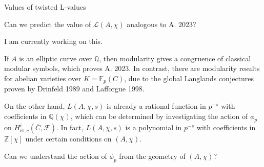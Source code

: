 \documentclass[10pt]{beamer}
\begin{document}
\begin{frame}[t]{Values of twisted L-values}

Can we predict the value of $ \mathcal{L}(A, \chi) $ analogous to A. 2023?

\pause

\vspace{0.5cm} I am currently working on this.

\pause

\vspace{0.5cm} If $ A $ is an elliptic curve over $ \mathbb{Q} $, then modularity gives a congruence of classical modular symbols, which proves A. 2023. \pause In contrast, there are modularity results for abelian varieties over $ K = \mathbb{F}_p(C) $, due to the global Langlands conjectures proven by Drinfeld 1989 and Lafforgue 1998.

\pause

\vspace{0.5cm} On the other hand, $ L(A, \chi, s) $ is already a rational function in $ p^{-s} $ with coefficients in $ \mathbb{Q}(\chi) $, which can be determined by investigating the action of $ \phi_p $ on $ H_{\text{\'et}, c}^i(\overline{C}, \mathcal{F}) $. \pause In fact, $ L(A, \chi, s) $ is a polynomial in $ p^{-s} $ with coefficients in $ \mathbb{Z}[\chi] $ under certain conditions on $ (A, \chi) $.

\pause

\vspace{0.5cm} Can we understand the action of $ \phi_p $ from the geometry of $ (A, \chi) $?

\end{frame}
\end{document}
